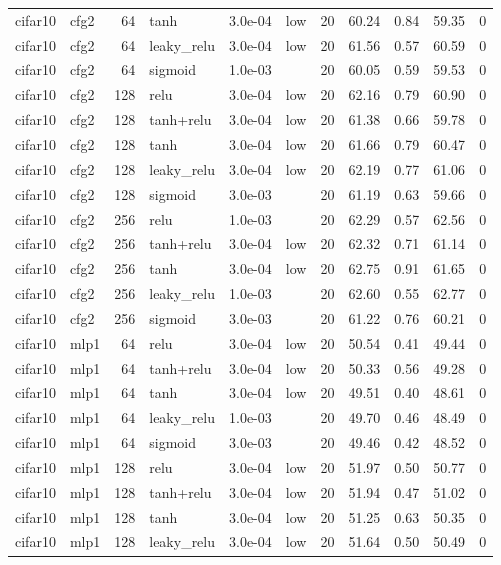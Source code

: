 \begin{table}[htbp]
{\begin{tabular}{@{}llrlrlrrrrr@{}}
cifar10 & cfg2 & 64 & tanh & 3.0e-04 & low & 20 & 60.24 & 0.84 & 59.35 & 0 \\
cifar10 & cfg2 & 64 & leaky\_relu & 3.0e-04 & low & 20 & 61.56 & 0.57 & 60.59 & 0 \\
cifar10 & cfg2 & 64 & sigmoid & 1.0e-03 &  & 20 & 60.05 & 0.59 & 59.53 & 0 \\
cifar10 & cfg2 & 128 & relu & 3.0e-04 & low & 20 & 62.16 & 0.79 & 60.90 & 0 \\
cifar10 & cfg2 & 128 & tanh+relu & 3.0e-04 & low & 20 & 61.38 & 0.66 & 59.78 & 0 \\
cifar10 & cfg2 & 128 & tanh & 3.0e-04 & low & 20 & 61.66 & 0.79 & 60.47 & 0 \\
cifar10 & cfg2 & 128 & leaky\_relu & 3.0e-04 & low & 20 & 62.19 & 0.77 & 61.06 & 0 \\
cifar10 & cfg2 & 128 & sigmoid & 3.0e-03 &  & 20 & 61.19 & 0.63 & 59.66 & 0 \\
cifar10 & cfg2 & 256 & relu & 1.0e-03 &  & 20 & 62.29 & 0.57 & 62.56 & 0 \\
cifar10 & cfg2 & 256 & tanh+relu & 3.0e-04 & low & 20 & 62.32 & 0.71 & 61.14 & 0 \\
cifar10 & cfg2 & 256 & tanh & 3.0e-04 & low & 20 & 62.75 & 0.91 & 61.65 & 0 \\
cifar10 & cfg2 & 256 & leaky\_relu & 1.0e-03 &  & 20 & 62.60 & 0.55 & 62.77 & 0 \\
cifar10 & cfg2 & 256 & sigmoid & 3.0e-03 &  & 20 & 61.22 & 0.76 & 60.21 & 0 \\
cifar10 & mlp1 & 64 & relu & 3.0e-04 & low & 20 & 50.54 & 0.41 & 49.44 & 0 \\
cifar10 & mlp1 & 64 & tanh+relu & 3.0e-04 & low & 20 & 50.33 & 0.56 & 49.28 & 0 \\
cifar10 & mlp1 & 64 & tanh & 3.0e-04 & low & 20 & 49.51 & 0.40 & 48.61 & 0 \\
cifar10 & mlp1 & 64 & leaky\_relu & 1.0e-03 &  & 20 & 49.70 & 0.46 & 48.49 & 0 \\
cifar10 & mlp1 & 64 & sigmoid & 3.0e-03 &  & 20 & 49.46 & 0.42 & 48.52 & 0 \\
cifar10 & mlp1 & 128 & relu & 3.0e-04 & low & 20 & 51.97 & 0.50 & 50.77 & 0 \\
cifar10 & mlp1 & 128 & tanh+relu & 3.0e-04 & low & 20 & 51.94 & 0.47 & 51.02 & 0 \\
cifar10 & mlp1 & 128 & tanh & 3.0e-04 & low & 20 & 51.25 & 0.63 & 50.35 & 0 \\
cifar10 & mlp1 & 128 & leaky\_relu & 3.0e-04 & low & 20 & 51.64 & 0.50 & 50.49 & 0 \\

\end{tabular}}
\end{table}
